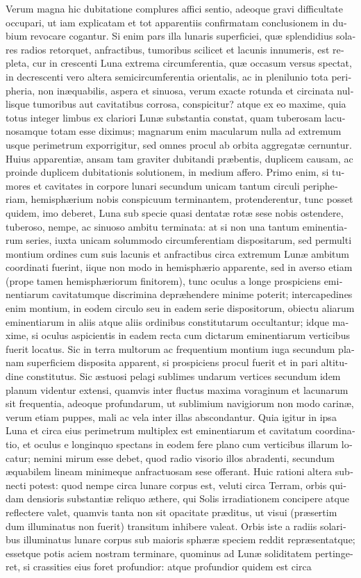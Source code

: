 \documentclass[11pt,twoside,openany]{book}
\begin{document}
\begin{otherlanguage}{latin}
Verum magna hic dubitatione complures affici sentio, adeoque gravi difficultate occupari, ut iam explicatam et tot apparentiis confirmatam conclusionem in dubium revocare cogantur. Si enim pars illa lunaris superficiei, quæ splendidius solares radios retorquet, anfractibus, tumoribus scilicet et lacunis innumeris, est repleta, cur in crescenti Luna extrema circumferentia, quæ occasum versus spectat, in decrescenti vero altera semicircumferentia orientalis, ac in plenilunio tota peripheria, non inæquabilis, aspera et sinuosa, verum exacte rotunda et circinata nullisque tumoribus aut cavitatibus corrosa, conspicitur? atque ex eo maxime, quia totus integer limbus ex clariori Lunæ substantia constat, quam tuberosam lacunosamque totam esse diximus; magnarum enim macularum nulla ad extremum usque perimetrum exporrigitur, sed omnes procul ab orbita aggregatæ cernuntur. Huius apparentiæ, ansam tam graviter dubitandi præbentis, duplicem causam, ac proinde duplicem dubitationis solutionem, in medium affero. Primo enim, si tumores et cavitates in corpore lunari secundum unicam tantum circuli peripheriam, hemisphærium nobis conspicuum terminantem, protenderentur, tunc posset quidem, imo deberet, Luna sub specie quasi dentatæ rotæ sese nobis ostendere, tuberoso, nempe, ac sinuoso ambitu terminata: at si non una tantum eminentiarum series, iuxta unicam solummodo circumferentiam dispositarum, sed permulti montium ordines cum suis lacunis et anfractibus circa extremum Lunæ ambitum coordinati fuerint, iique non modo in hemisphærio apparente, sed in averso etiam (prope tamen hemisphæriorum finitorem), tunc oculus a longe prospiciens eminentiarum cavitatumque discrimina depræhendere minime poterit; intercapedines enim montium, in eodem circulo seu in eadem serie dispositorum, obiectu aliarum eminentiarum in aliis atque aliis ordinibus constitutarum occultantur; idque maxime, si oculus aspicientis in eadem recta cum dictarum eminentiarum verticibus fuerit locatus. Sic in terra multorum ac frequentium montium iuga secundum planam superficiem disposita apparent, si prospiciens procul fuerit et in pari altitudine constitutus. Sic æstuosi pelagi sublimes undarum vertices secundum idem planum videntur extensi, quamvis inter fluctus maxima voraginum et lacunarum sit frequentia, adeoque profundarum, ut sublimium navigiorum non modo carinæ, verum etiam puppes, mali ac vela inter illas abscondantur. Quia igitur in ipsa Luna et circa eius perimetrum multiplex est eminentiarum et cavitatum coordinatio, et oculus e longinquo spectans in eodem fere plano cum verticibus illarum locatur; nemini mirum esse debet, quod radio visorio illos abradenti, secundum æquabilem lineam minimeque anfractuosam sese offerant. Huic rationi altera subnecti potest: quod nempe circa lunare corpus est, veluti circa Terram, orbis quidam densioris substantiæ reliquo æthere, qui Solis irradiationem concipere atque reflectere valet, quamvis tanta non sit opacitate præditus, ut visui (præsertim dum illuminatus non fuerit) transitum inhibere valeat. Orbis iste a radiis solaribus illuminatus lunare corpus sub maioris sphæræ speciem reddit repræsentatque; essetque potis aciem nostram terminare, quominus ad Lunæ soliditatem pertingeret, si crassities eius foret profundior: atque profundior quidem est circa 
\end{otherlanguage}
\end{document}

